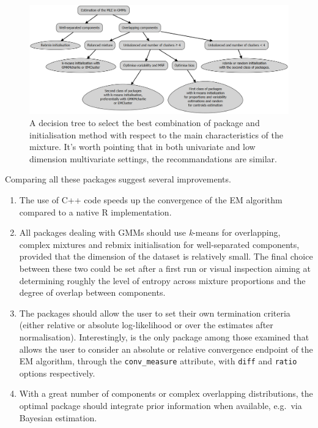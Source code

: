 \begin{figure}

{\centering \includegraphics[width=1\linewidth]{./figures/decision_tree_GMMs} 

}

\caption{A decision tree to select the best combination of package and initialisation method with respect to the main characteristics of the mixture. It's worth pointing that in both univariate and low dimension multivariate settings, the recommandations are similar.}\label{fig:decision-tree-GMMs}
\end{figure}

Comparing all these packages suggest several improvements.

\begin{enumerate}
\def\labelenumi{\arabic{enumi}.}
\item
  The use of C++ code speeds up the convergence of the EM algorithm
  compared to a native R implementation.
\item
  All packages dealing with GMMs should use \emph{k}-means for overlapping, complex mixtures and rebmix initialisation for well-separated components, provided that the dimension of the dataset is relatively small. The final choice between these two could be set after a first run or visual inspection aiming at determining roughly the level of entropy across mixture proportions and the degree of overlap between components.
\item
  The packages should allow the user to set their own termination criteria (either relative or absolute log-likelihood or over the estimates after normalisation). Interestingly,  is the only package among those examined that allows the user to consider an absolute or relative convergence endpoint of the EM algorithm, through the \texttt{conv\_measure} attribute, with \texttt{diff} and \texttt{ratio} options respectively.
\item
  With a great number of components or complex overlapping distributions, the optimal package should integrate prior information when available, e.g.~via Bayesian estimation.
\end{enumerate}

